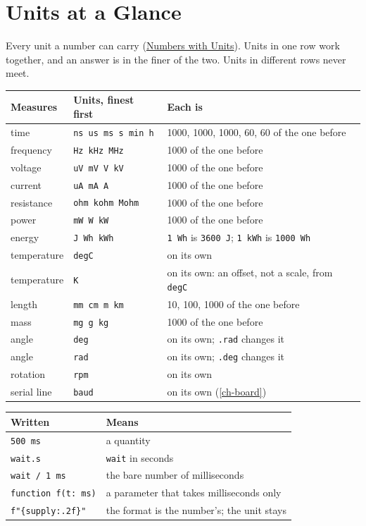 \chapter{Units at a Glance}\label{app-unit-table}

Every unit a number can carry (\hyperref[ch-units]{Numbers with Units}).
Units in one row work together, and an answer is in the finer of the
two. Units in different rows never meet.

\begin{center}
\begin{longtable}{lll}
\toprule
Measures & Units, finest first & Each is \\
\midrule
\endhead
time & \verb|ns us ms s min h| & 1000, 1000, 1000, 60, 60 of the one before \\
frequency & \verb|Hz kHz MHz| & 1000 of the one before \\
voltage & \verb|uV mV V kV| & 1000 of the one before \\
current & \verb|uA mA A| & 1000 of the one before \\
resistance & \verb|ohm kohm Mohm| & 1000 of the one before \\
power & \verb|mW W kW| & 1000 of the one before \\
energy & \verb|J Wh kWh| & \verb|1 Wh| is \verb|3600 J|; \verb|1 kWh| is \verb|1000 Wh| \\
temperature & \verb|degC| & on its own \\
temperature & \verb|K| & on its own: an offset, not a scale, from \verb|degC| \\
length & \verb|mm cm m km| & 10, 100, 1000 of the one before \\
mass & \verb|mg g kg| & 1000 of the one before \\
angle & \verb|deg| & on its own; \verb|.rad| changes it \\
angle & \verb|rad| & on its own; \verb|.deg| changes it \\
rotation & \verb|rpm| & on its own \\
serial line & \verb|baud| & on its own (\hyperref[ch-board]{\ref*{ch-board}}) \\
\bottomrule
\end{longtable}
\end{center}

\begin{center}
\begin{tabular}{ll}
\toprule
Written & Means \\
\midrule
\verb|500 ms| & a quantity \\
\verb|wait.s| & \verb|wait| in seconds \\
\verb|wait / 1 ms| & the bare number of milliseconds \\
\verb|function f(t: ms)| & a parameter that takes milliseconds only \\
\verb|f"{supply:.2f}"| & the format is the number's; the unit stays \\
\bottomrule
\end{tabular}
\end{center}
